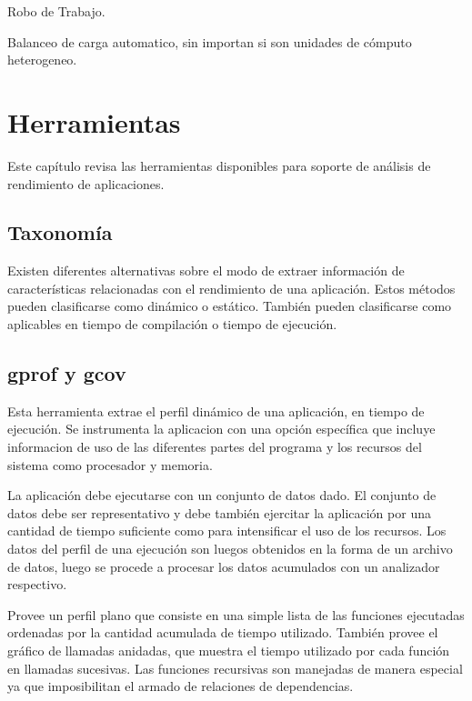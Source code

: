 \documentclass[a4paper]{report}
\begin{document}
Robo de Trabajo.

Balanceo de carga automatico, sin importan si son unidades de c\'omputo heterogeneo.

\chapter{Herramientas}

Este cap\'itulo revisa las herramientas disponibles para soporte de an\'alisis
de rendimiento de aplicaciones.

\section{Taxonom\'ia}

Existen diferentes alternativas sobre el modo de extraer informaci\'on de
caracter\'isticas relacionadas con el rendimiento de una aplicaci\'on.
Estos m\'etodos pueden clasificarse como din\'amico o est\'atico.
Tambi\'en pueden clasificarse como aplicables en tiempo de compilaci\'on o
tiempo de ejecuci\'on.


\section{gprof y gcov}

Esta herramienta extrae el perfil din\'amico de una aplicaci\'on, en tiempo
de ejecuci\'on. Se instrumenta la aplicacion con una opci\'on espec\'ifica que
incluye informacion de uso de las diferentes partes del programa y los
recursos del sistema como procesador y memoria.

\bigskip

La aplicaci\'on debe ejecutarse con un conjunto de datos dado. El conjunto de
datos debe ser representativo y debe tambi\'en ejercitar la aplicaci\'on por
una cantidad de tiempo suficiente como para intensificar el uso de los
recursos. Los datos del perfil de una ejecuci\'on son luegos obtenidos en la
forma de un archivo de datos, luego se procede a procesar los datos acumulados
con un analizador respectivo.

\bigskip

Provee un perfil plano que consiste en una simple lista de las funciones
ejecutadas ordenadas por la cantidad acumulada de tiempo utilizado.
Tambi\'en provee el gr\'afico de llamadas anidadas, que muestra el tiempo
utilizado por cada funci\'on en llamadas sucesivas. Las funciones recursivas
son manejadas de manera especial ya que imposibilitan el armado de relaciones
de dependencias.
\end{document}
